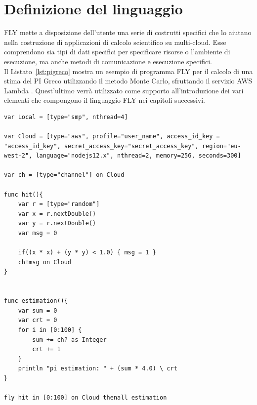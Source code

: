 \section{Definizione del linguaggio}
FLY mette a disposizione dell'utente una serie di costrutti specifici che lo aiutano nella costruzione di applicazioni di calcolo scientifico su multi-cloud. Esse comprendono sia tipi di dati specifici per specificare risorse o l'ambiente di esecuzione, ma anche metodi di comunicazione e esecuzione specifici. \\
Il Listato~\ref{lst:pigreco} mostra un esempio di programma FLY per il calcolo di una stima del PI Greco utilizzando il metodo Monte Carlo, sfruttando il servizio AWS Lambda  \cite{lambdasite}. Quest'ultimo verrà utilizzato come supporto all'introduzione dei vari elementi che compongono il linguaggio FLY nei capitoli successivi.
\begin{lstlisting}[language=FLY,caption={Stima di PI Greco usando il metodo Monte Carlo su ambiente AWS.}, label={lst:pigreco}]
var Local = [type="smp", nthread=4]

var Cloud = [type="aws", profile="user_name", access_id_key = "access_id_key", secret_access_key="secret_access_key", region="eu-west-2", language="nodejs12.x", nthread=2, memory=256, seconds=300]

var ch = [type="channel"] on Cloud

func hit(){	
    var r = [type="random"]
    var x = r.nextDouble()
    var y = r.nextDouble()
    var msg = 0
    
    if((x * x) + (y * y) < 1.0) { msg = 1 }
    ch!msg on Cloud
}


func estimation(){
    var sum = 0
    var crt = 0
    for i in [0:100] {
        sum += ch? as Integer
        crt += 1
    }
    println "pi estimation: " + (sum * 4.0) \ crt
}

fly hit in [0:100] on Cloud thenall estimation  
\end{lstlisting}  

